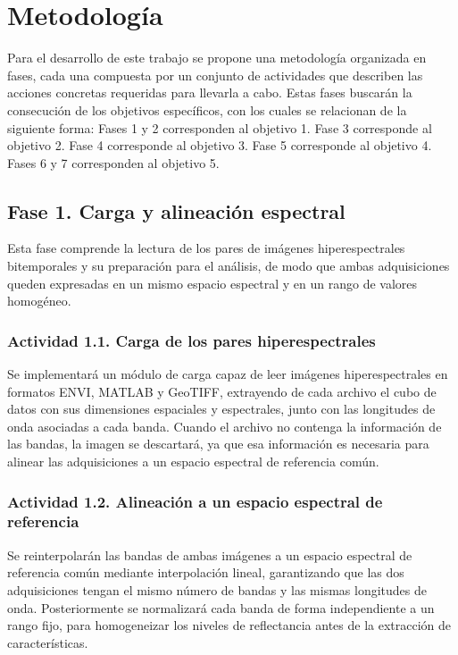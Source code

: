 \documentclass[12pt,onecolumn]{IEEEtran}
\begin{document}
    \newpage
\section{\textbf{Metodología}}
Para el desarrollo de este trabajo se propone una metodología organizada en fases, cada una compuesta por un conjunto de actividades que describen las acciones concretas requeridas para llevarla a cabo. Estas fases buscarán la consecución de los objetivos específicos, con los cuales se relacionan de la siguiente forma: Fases 1 y 2 corresponden al objetivo 1. Fase 3 corresponde al objetivo 2. Fase 4 corresponde al objetivo 3. Fase 5 corresponde al objetivo 4. Fases 6 y 7 corresponden al objetivo 5.



\subsection{{Fase 1. Carga y alineación espectral}}

Esta fase comprende la lectura de los pares de imágenes hiperespectrales bitemporales y su preparación para el análisis, de modo que ambas adquisiciones queden expresadas en un mismo espacio espectral y en un rango de valores homogéneo.

\subsubsection{{Actividad 1.1. Carga de los pares hiperespectrales}}

Se implementará un módulo de carga capaz de leer imágenes hiperespectrales en formatos ENVI, MATLAB y GeoTIFF, extrayendo de cada archivo el cubo de datos con sus dimensiones espaciales y espectrales, junto con las longitudes de onda asociadas a cada banda. Cuando el archivo no contenga la información de las bandas, la imagen se descartará, ya que esa información es necesaria para alinear las adquisiciones a un espacio espectral de referencia común.

\subsubsection{{Actividad 1.2. Alineación a un espacio espectral de referencia}}

Se reinterpolarán las bandas de ambas imágenes a un espacio espectral de referencia común mediante interpolación lineal, garantizando que las dos adquisiciones tengan el mismo número de bandas y las mismas longitudes de onda. Posteriormente se normalizará cada banda de forma independiente a un rango fijo, para homogeneizar los niveles de reflectancia antes de la extracción de características.
\end{document}
